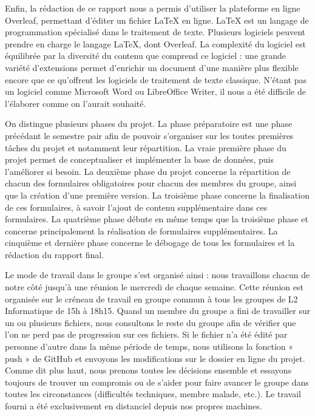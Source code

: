 \documentclass[12pt]{report}
\begin{document}
        \bigskip
        \par
        Enfin, la rédaction de ce rapport nous a permis d’utiliser la plateforme en ligne Overleaf, permettant d’éditer un fichier LaTeX en ligne. LaTeX est un langage de programmation spécialisé dans le traitement de texte. Plusieurs logiciels peuvent prendre en charge le langage LaTeX, dont Overleaf. La complexité du logiciel est équilibrée par la diversité du contenu que comprend ce logiciel : une grande variété d’extensions permet d’enrichir un document d’une manière plus flexible encore que ce qu’offrent les logiciels de traitement de texte classique. N’étant pas un logiciel comme Microsoft Word ou LibreOffice Writer, il nous a été difficile de l’élaborer comme on l’aurait souhaité.
        
        \bigskip
        \par
        On distingue plusieurs phases du projet. La phase préparatoire est une phase précédant le semestre pair afin de pouvoir s’organiser sur les toutes premières tâches du projet et notamment leur répartition. La vraie première phase du projet permet de conceptualiser et implémenter la base de données, puis l’améliorer si besoin. La deuxième phase du projet concerne la répartition de chacun des formulaires obligatoires pour chacun des membres du groupe, ainsi que la création d’une première version. La troisième phase concerne la finalisation de ces formulaires, à savoir l’ajout de contenu supplémentaire dans ces formulaires. La quatrième phase débute en même temps que la troisième phase et concerne principalement la réalisation de formulaires supplémentaires. La cinquième et dernière phase concerne le débogage de tous les formulaires et la rédaction du rapport final.
        
        \bigskip
        \par
        Le mode de travail dans le groupe s’est organisé ainsi : nous travaillons chacun de notre côté jusqu’à une réunion le mercredi de chaque semaine. Cette réunion est organisée sur le créneau de travail en groupe commun à tous les groupes de L2 Informatique de 15h à 18h15. Quand un membre du groupe a fini de travailler sur un ou plusieurs fichiers, nous consultons le reste du groupe afin de vérifier que l’on ne perd pas de progression sur ces fichiers. Si le fichier n’a été édité par personne d’autre dans la même période de temps, nous utilisons la fonction « push » de GitHub et envoyons les modifications sur le dossier en ligne du projet. Comme dit plus haut, nous prenons toutes les décisions ensemble et essayons toujours de trouver un compromis ou de s’aider pour faire avancer le groupe dans toutes les circonstances (difficultés techniques, membre malade, etc.). Le travail fourni a été exclusivement en distanciel depuis nos propres machines.
        
\end{document}
